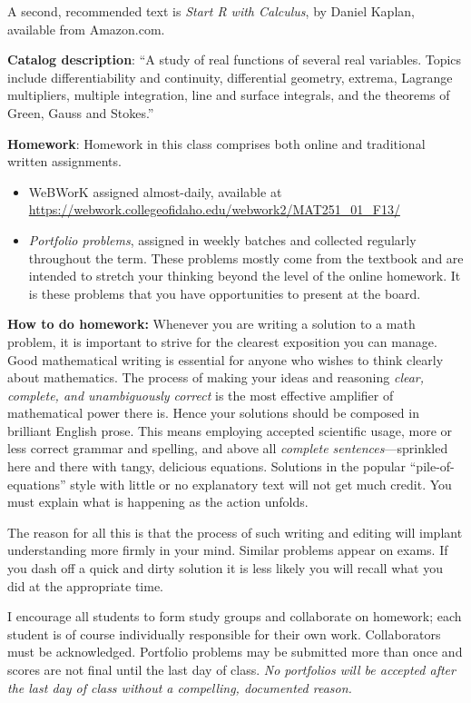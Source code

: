 \documentclass[12pt,twoside]{amsart}
\begin{document}
A second, recommended text is \emph{Start R with Calculus}, by Daniel Kaplan, available from Amazon.com. 

\textbf{Catalog description}: ``A study of real functions of several real variables. Topics include differentiability and continuity, differential geometry, extrema, Lagrange multipliers, multiple integration, line and surface integrals, and the theorems of Green, Gauss and Stokes.''

\textbf{Homework}: Homework in this class comprises both online and traditional written assignments.
\begin{itemize}
    \item WeBWorK assigned almost-daily, available at \\
    \url{https://webwork.collegeofidaho.edu/webwork2/MAT251_01_F13/}
    \item \emph{Portfolio problems}, assigned in weekly batches and collected regularly throughout the term. These problems mostly come from the textbook and are intended to stretch your thinking beyond the level of the online homework. It is these problems that you have opportunities to present at the board.
\end{itemize}

\textbf{How to do homework:} Whenever you are writing a solution to a math problem, it is important to strive for the clearest exposition you can manage. Good mathematical writing is essential for anyone who wishes to think clearly about mathematics. The process of making your ideas and reasoning \emph{clear, complete, and unambiguously correct} is the most effective amplifier of mathematical power there is. Hence your solutions should be composed in brilliant English prose. This means employing accepted scientific usage, more or less correct grammar and spelling, and above all \emph{complete sentences}---sprinkled here and there with tangy, delicious equations. Solutions in the popular ``pile-of-equations'' style with little or no explanatory text will not get much credit. You must explain what is happening as the action unfolds. 

The reason for all this is that the process of such writing and editing will implant understanding more firmly in your mind. Similar problems appear on exams. If you dash off a quick and dirty solution it is less likely you will recall what you did at the appropriate time.

I encourage all students to form study groups and collaborate on homework; each student is of course individually responsible for their own work. Collaborators must be acknowledged. Portfolio problems may be submitted more than once and scores are not final until the last day of class. \emph{No portfolios will be accepted after the last day of class without a compelling, documented reason.}
\end{document}
